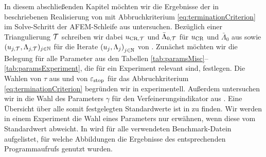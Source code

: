 In diesem abschließenden Kapitel möchten wir die Ergebnisse der in
 beschriebenen Realisierung von
 mit Abbruchkriterium
\eqref{eq:terminationCriterion} im Solve-Schritt der AFEM-Schleife aus
 untersuchen.
Bezüglich einer Triangulierung $\mathcal{T}$ schreiben wir dabei $u_{\textup{CR}, \mathcal{T}}$ und
$\bar\Lambda_{0,\mathcal{T}}$ für $u_\textup{CR}$ und $\bar\Lambda_0$ aus
 sowie $(u_{j, \mathcal{T}}, \Lambda_{j,\mathcal{T}})_{j\in\mathbb{N}}$
für die Iterate $\left(u_j, \Lambda_j\right)_{j\in\mathbb{N}}$  von
.
Zunächst möchten wir die Belegung für alle Parameter aus den Tabellen
\ref{tab:paramsMisc}--\ref{tab:paramsExperiment}, die für ein Experiment
relevant sind, festlegen.
Die Wahlen von $\tau$ aus  und von $\varepsilon_{\textup{stop}}$ für
das Abbruchkriterium \eqref{eq:terminationCriterion} begründen wir in
 experimentell. 
Außerdem untersuchen wir in  die Wahl
des Parameters $\gamma$ für den Verfeinerungsindikator aus
.
Eine Übersicht über alle somit festgelegten Standardwerte ist in
 zu finden. 
Wir werden in einem Experiment die Wahl eines Parameters nur
erwähnen, wenn diese vom Standardwert abweicht.
In  wird für alle verwendeten Benchmark-Datein
aufgelistet, für welche Abbildungen die Ergebnisse des entsprechenden
Programmaufrufs genutzt wurden.

